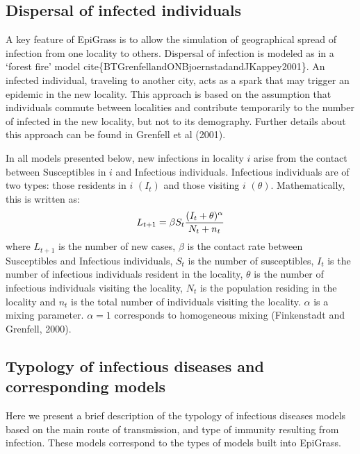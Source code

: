 \documentclass[a4paper,10pt,english]{sphinxmanual}
\begin{document}
\subsection{Dispersal of infected individuals}
\label{intromodels:dispersal-of-infected-individuals}
A key feature of EpiGrass is to allow the simulation of geographical spread of infection from one locality to others. Dispersal of infection is modeled as in a `forest fire' model cite\{BTGrenfellandONBjoernstadandJKappey2001\}. An infected individual, traveling to another city, acts as a spark that may trigger an epidemic in the new locality. This approach is based on the assumption that individuals commute between localities and contribute temporarily to the number of infected in the new locality, but not to its demography. Further details about this approach can be found in Grenfell et al (2001).

In all models presented below, new infections in locality \(i\) arise from the contact between Susceptibles in \(i\) and Infectious individuals. Infectious individuals are of two types: those residents in \(i\) \((I_t)\) and those visiting \(i\) \((\theta)\). Mathematically, this is written as:
\begin{gather}
\begin{split}L_{t+1} = \beta S_t \frac{(I_t+\theta)^\alpha} {N_t+n_t}\end{split}\notag
\end{gather}
where \(L_{t+1}\) is the number of new cases, \(\beta\) is the contact rate between Susceptibles and Infectious individuals, \(S_t\) is the number of susceptibles, \(I_t\) is the number of infectious individuals resident in the locality, \(\theta\) is the number of infectious individuals visiting the locality, \(N_t\) is the population residing in the locality and \(n_t\) is the total number of individuals visiting the locality. \(\alpha\) is a mixing parameter. \(\alpha=1\) corresponds to homogeneous mixing (Finkenstadt and Grenfell, 2000).


\subsection{Typology of infectious diseases and corresponding models}
\label{intromodels:typology-of-infectious-diseases-and-corresponding-models}
Here we present a brief description of the typology of infectious
diseases models based on the main route of transmission, and type of
immunity resulting from infection. These models correspond to the
types of models built into EpiGrass.
\end{document}
